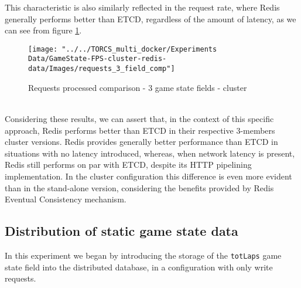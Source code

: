 This characteristic is also similarly reflected in the request rate, where Redis generally performs better than ETCD, regardless of the amount of latency, as we can see from figure \ref{fig:requests-3-field-comparison-cluster}. \\
\begin{figure}[h!]
	\centering
	\texttt{[image: "../../TORCS\_multi\_docker/Experiments Data/GameState-FPS-cluster-redis-data/Images/requests\_3\_field\_comp"]}
	\caption[Requests processed comparison - 3 game state fields - cluster]{Requests processed comparison - 3 game state fields - cluster}
	\label{fig:requests-3-field-comparison-cluster}
\end{figure}
\\ Considering these results, we can assert that, in the context of this specific approach, Redis performs better than ETCD in their respective 3-members cluster versions. Redis provides generally better performance than ETCD in situations with no latency introduced, whereas, when network latency is present, Redis still performs on par with ETCD, despite its HTTP pipelining implementation. In the cluster configuration this difference is even more evident than in the stand-alone version, considering the benefits provided by Redis Eventual Consistency mechanism.

\subsection{Distribution of static game state data}
In this experiment we began by introducing the storage of the \texttt{totLaps} game state field into the distributed database, in a configuration with only write requests.

